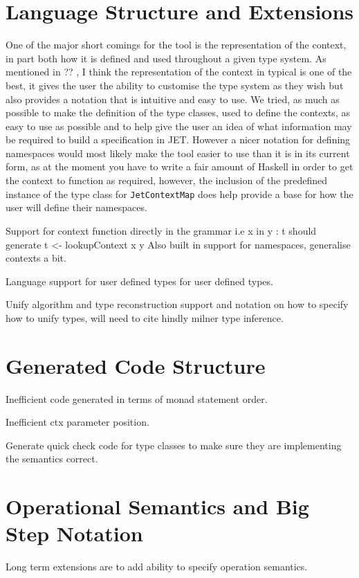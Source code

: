 \section{Language Structure and Extensions}
One of the major short comings for the tool is the representation of the context, in part both how it is defined and used throughout a given type system.
As mentioned in ?? , I think the representation of the context in typical is one of the best, it gives the user the ability to customise the type system as they wish but also provides a notation that is intuitive and easy to use.
We tried, as much as possible to make the definition of the type classes, used to define the contexts, as easy to use as possible and to help give the user an idea of what information may be required to build a specification in JET.
However a nicer notation for defining namespaces would most likely make the tool easier to use than it is in its current form, as at the moment you have to write a fair amount of Haskell in order to get the context to function as required, however, the inclusion of the predefined instance of the type class for \texttt{JetContextMap} does help provide a base for how the user will define their namespaces.

Support for context function directly in the grammar i.e x in y : t should generate t <- lookupContext x y
Also built in support for namespaces, generalise contexts a bit.

Language support for user defined types for user defined types.

Unify algorithm and type reconstruction support and notation on how to specify how to unify types, will need to cite hindly milner type inference.

\section{Generated Code Structure}
Inefficient code generated in terms of monad statement order.

Inefficient ctx parameter position.

Generate quick check code for type classes to make sure they are implementing the semantics correct.

\section{Operational Semantics and Big Step Notation}
Long term extensions are to add ability to specify operation semantics.